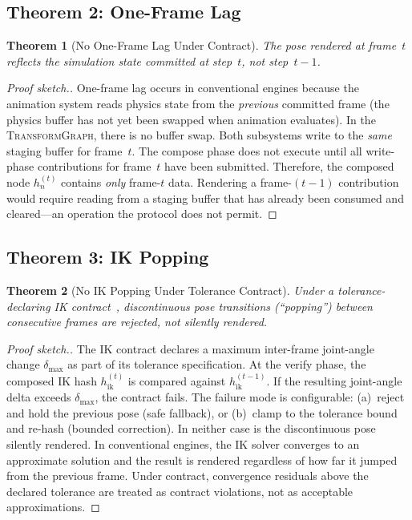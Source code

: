 \documentclass[sigconf,nonacm]{acmart}
\newcommand{\transformgraph}{\textsc{TransformGraph}}
\newtheorem{theorem}{Theorem}
\begin{document}
\subsection{Theorem 2: One-Frame Lag}
\begin{theorem}[No One-Frame Lag Under Contract]
The pose rendered at frame~$t$ reflects the simulation state
committed at step~$t$, not step~$t-1$.
\end{theorem}

\begin{proof}[Proof sketch.]
One-frame lag occurs in conventional engines because the
animation system reads physics state from the \emph{previous}
committed frame (the physics buffer has not yet been swapped
when animation evaluates). In the \transformgraph{}, there is
no buffer swap. Both subsystems write to the \emph{same}
staging buffer for frame~$t$. The compose phase does not
execute until all write-phase contributions for frame~$t$
have been submitted. Therefore, the composed node
$h_n^{(t)}$ contains \emph{only} frame-$t$ data.
Rendering a frame-$(t{-}1)$ contribution would require
reading from a staging buffer that has already been consumed
and cleared---an operation the protocol does not permit.
\end{proof}

\subsection{Theorem 3: IK Popping}
\label{sec:theorem:ik}
\begin{theorem}[No IK Popping Under Tolerance Contract]\label{thm:ik-popping}
Under a tolerance-declaring IK
contract~\cite{paper-7-ik-siggraph2027}, discontinuous pose
transitions (``popping'') between consecutive frames are
rejected, not silently rendered.
\end{theorem}

\begin{proof}[Proof sketch.]
The IK contract declares a maximum inter-frame joint-angle
change $\delta_{\max}$ as part of its tolerance specification.
At the verify phase, the composed IK hash $h_{\text{ik}}^{(t)}$
is compared against $h_{\text{ik}}^{(t-1)}$. If the resulting
joint-angle delta exceeds $\delta_{\max}$, the contract fails.
The failure mode is configurable: (a)~reject and hold the
previous pose (safe fallback), or (b)~clamp to the tolerance
bound and re-hash (bounded correction). In neither case is the
discontinuous pose silently rendered. In conventional engines,
the IK solver converges to an approximate solution and the
result is rendered regardless of how far it jumped from the
previous frame. Under contract, convergence residuals above
the declared tolerance are treated as contract violations,
not as acceptable approximations.
\end{proof}
\end{document}
